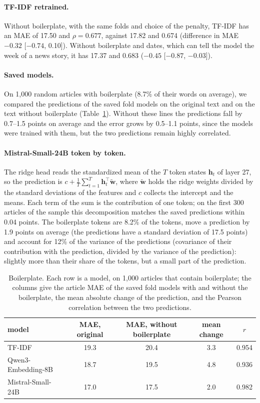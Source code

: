 \documentclass[11pt,a4paper]{article}
\begin{document}
\paragraph{TF-IDF retrained.} Without boilerplate, with the same folds and choice of the penalty, TF-IDF has an MAE of
17.50 and $\rho = 0.677$, against 17.82 and 0.674 (difference in MAE $-0.32$ [$-0.74$, 0.10]). Without boilerplate and
dates, which can tell the model the week of a news story, it has 17.37 and 0.683 ($-0.45$ [$-0.87$, $-0.03$]).

\paragraph{Saved models.} On 1,000 random articles with boilerplate (8.7\% of their words on average), we compared the
predictions of the saved fold models on the original text and on the text without boilerplate (Table~\ref{tab:reading}).
Without these lines the predictions fall by 0.7--1.5 points on average and the error grows by 0.5--1.1 points, since
the models were trained with them, but the two predictions remain highly correlated.

\paragraph{Mistral-Small-24B token by token.} The ridge head reads the standardized mean of the $T$ token states
$\mathbf{h}_t$ of layer 27, so the prediction is $c + \frac{1}{T}\sum_{t=1}^{T}\mathbf{h}_t^\top\tilde{\mathbf{w}}$,
where $\tilde{\mathbf{w}}$ holds the ridge weights divided by the standard deviations of the features and $c$ collects
the intercept and the means. Each term of the sum is the contribution of one token; on the first 300 articles of the
sample this decomposition matches the saved predictions within 0.04 points. The boilerplate tokens are 8.2\% of the
tokens, move a prediction by 1.9 points on average (the predictions have a standard deviation of 17.5 points) and
account for 12\% of the variance of the predictions (covariance of their contribution with the prediction, divided by
the variance of the prediction): slightly more than their share of the tokens, but a small part of the prediction.

\begin{table}[h]
\centering
\caption{Boilerplate. Each row is a model, on 1,000 articles that contain boilerplate; the columns give the article MAE
of the saved fold models with and without the boilerplate, the mean absolute change of the prediction, and the Pearson
correlation between the two predictions.}\label{tab:reading}
\begin{tabular}{lcccc}
\toprule
model & MAE, original & MAE, without boilerplate & mean change & $r$ \\
\midrule
TF-IDF & 19.3 & 20.4 & 3.3 & 0.954 \\
Qwen3-Embedding-8B & 18.7 & 19.5 & 4.8 & 0.936 \\
Mistral-Small-24B & 17.0 & 17.5 & 2.0 & 0.982 \\
\bottomrule
\end{tabular}
\end{table}
\end{document}
